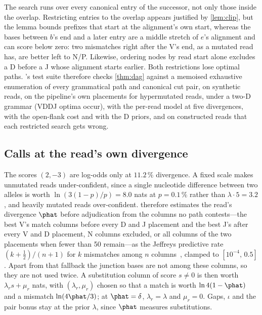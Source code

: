 \documentclass[11pt,a4paper]{article}
\begin{document}
The search runs over every canonical entry of the successor, not only those
inside the overlap. Restricting entries to the overlap appears justified by
\cref{lem:clip}, but the lemma bounds prefixes that start at the alignment's
own start, whereas the bases between $b$'s end and a later entry are a
middle stretch of $e$'s alignment and can score below zero: two mismatches
right after the V's end, as a mutated read has, are better left to N/P.
Likewise, ordering nodes by read start alone excludes a D before a J whose
alignment starts earlier. Both restrictions lose optimal paths. \swig's test
suite therefore checks \cref{thm:dag} against a
memoised exhaustive enumeration of every grammatical path and canonical cut
pair, on synthetic reads, on the pipeline's own placements for hypermutated
reads, under a two-D grammar (VDDJ optima occur), with the per-read model at
five divergences, with the open-flank cost and with the D priors, and on
constructed reads that each restricted search gets wrong.

\subsection{Calls at the read's own divergence}
\label{sec:perread}

The scores $(2,-3)$ are log-odds only at $11.2\,\%$ divergence. A fixed scale
makes unmutated reads under-confident, since a single nucleotide difference
between two alleles is worth $\ln(3(1-p)/p)=8.0$ nats at $p=0.1\,\%$ rather
than $\lambda\cdot 5=3.2$, and heavily mutated reads over-confident. \swig{}
therefore estimates the read's divergence $\phat$ before adjudication from
the columns no path contests---the best V's match columns before every D and
J placement and the best J's after every V and D placement, N columns
excluded, or all columns of the two placements when fewer than 50
remain---as the Jeffreys predictive rate $(k+\tfrac12)/(n+1)$ for $k$
mismatches among $n$ columns~\cite{jeffreys1946}, clamped to
$[10^{-4},\,0.5]$. Apart from that fallback the junction bases are not among
these columns, so they are not used twice. A substitution column of score
$s\neq 0$ is then worth
$\lambda_r s+\mu_r$ nats, with $(\lambda_r,\mu_r)$ chosen so that a match is
worth $\ln 4(1-\phat)$ and a mismatch $\ln(4\phat/3)$; at $\phat=\delta$,
$\lambda_r=\lambda$ and $\mu_r=0$. Gaps, $\iota$ and the pair bonus stay at
the prior $\lambda$, since $\phat$ measures substitutions.
\end{document}
